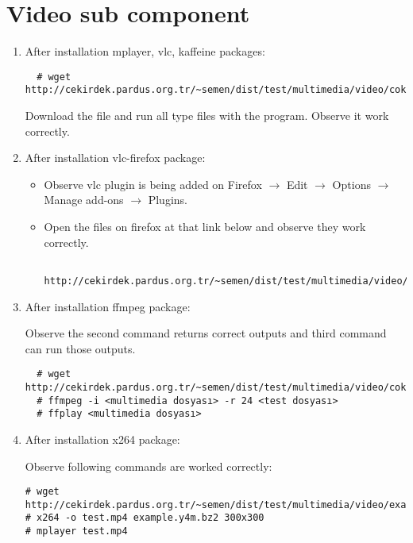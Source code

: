 \documentclass[a4paper,10pt]{article}
\begin{document}
\section{Video sub component}
\begin{enumerate}
 \item After installation mplayer, vlc, kaffeine packages:
 \begin{verbatim}
  # wget http://cekirdek.pardus.org.tr/~semen/dist/test/multimedia/video/cokluortam.tar
 \end{verbatim}
Download the file and run all type files with the program. Observe it work correctly.
 \item After installation vlc-firefox package:
 \begin{itemize}
  \item Observe vlc plugin is being added on Firefox $\rightarrow$ Edit $\rightarrow$ Options $\rightarrow$ Manage add-ons $\rightarrow$ Plugins.
  \item Open the files on firefox at that link below and observe they work correctly.
  \begin{verbatim}
  http://cekirdek.pardus.org.tr/~semen/dist/test/multimedia/video/cokluortam/  
  \end{verbatim}
 \end{itemize}
\item After installation ffmpeg package:
 
Observe the second command returns correct outputs and third command can run those outputs.
\begin{verbatim}
  # wget http://cekirdek.pardus.org.tr/~semen/dist/test/multimedia/video/cokluortam.tar 
  # ffmpeg -i <multimedia dosyası> -r 24 <test dosyası>
  # ffplay <multimedia dosyası>
  \end{verbatim}
\item After installation x264 package:

Observe following commands are worked correctly:
\begin{verbatim}
# wget  http://cekirdek.pardus.org.tr/~semen/dist/test/multimedia/video/example.y4m.bz2
# x264 -o test.mp4 example.y4m.bz2 300x300 
# mplayer test.mp4
\end{verbatim}

\end{enumerate}
\end{document}
